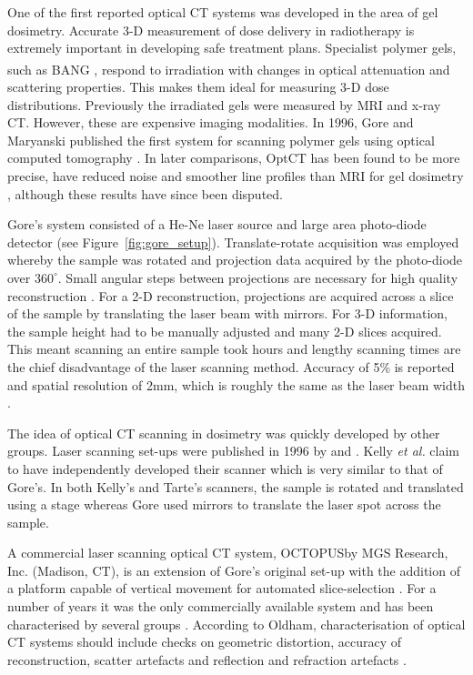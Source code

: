 	One of the first reported optical CT systems was developed in the area of gel dosimetry. Accurate 3-D measurement of dose delivery in radiotherapy is extremely important in developing safe treatment plans. Specialist polymer gels, such as BANG\textsuperscript{\textregistered} \cite{Maryanski:1996}, respond to irradiation with changes in optical attenuation and scattering properties.  This makes them ideal for measuring 3-D dose distributions. Previously the irradiated gels were measured by MRI and x-ray CT. However, these are expensive imaging modalities. In 1996, Gore and Maryanski published the first system for scanning polymer gels using optical computed tomography \cite{Gore:1999tg}. In later comparisons, OptCT has been found to be more precise, have reduced noise and smoother line profiles than MRI for gel dosimetry \cite{Oldham:2001gs}, although these results have since been disputed. 
	
	Gore's system consisted of a  He-Ne laser source and large area photo-diode detector (see Figure~\ref{fig:gore_setup}). Translate-rotate acquisition was employed whereby the sample was rotated and projection data  acquired  by the photo-diode over $360^{\circ}$. Small angular steps between projections are necessary for high quality reconstruction \cite{russ2002image}. For a 2-D reconstruction, projections are acquired across a slice of the sample by translating the laser beam with mirrors. For 3-D information, the sample height  had to be manually adjusted and many 2-D slices acquired. This meant scanning an entire sample took  hours and lengthy scanning times are the chief disadvantage of the laser scanning method.  Accuracy of 5\% is reported and spatial resolution of 2mm, which is roughly the same as the laser beam width \cite{Gore:1999tg}.
	
	The idea of optical CT scanning in dosimetry was quickly developed by other groups. Laser scanning set-ups were published in 1996 by \cite{Tarte:2006} and  \cite{Kelly:1998}.
	Kelly \textit{et al.} claim to have independently developed their scanner which is very similar to that of Gore's. In  both Kelly's and Tarte's  scanners, the sample is rotated and translated using a stage whereas Gore used mirrors to translate the laser spot across the sample. 
	
	
	A commercial laser scanning optical CT system, OCTOPUS\texttrademark by MGS Research, Inc.
	(Madison, CT),  is an extension of Gore's original set-up with the addition of a platform capable of vertical movement for automated slice-selection \cite{Islam:2003gs}. For a number of years it was the only commercially available system and has been characterised by several groups \cite{Xu:2003cc, Islam:2003gs, Xu:2004iv, Sakhalkar:2009hb}. According to Oldham, characterisation of optical CT systems should include checks on geometric distortion, accuracy of reconstruction, scatter artefacts and reflection and refraction artefacts \cite{Oldham:2004cj}.
	
